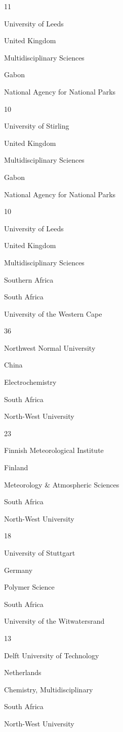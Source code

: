\documentclass[
]{book}
\begin{document}
{11}

{University of Leeds }

{United Kingdom}

{Multidisciplinary Sciences }

{Gabon }

{National Agency for National Parks}

{10}

{University of Stirling }

{United Kingdom}

{Multidisciplinary Sciences }

{Gabon }

{National Agency for National Parks}

{10}

{University of Leeds }

{United Kingdom}

{Multidisciplinary Sciences }

Southern Africa

{South Africa}

{University of the Western Cape }

{36}

{Northwest Normal University }

{China }

{Electrochemistry }

{South Africa}

{North-West University }

{23}

{Finnish Meteorological Institute}

{Finland }

{Meteorology \& Atmospheric Sciences }

{South Africa}

{North-West University }

{18}

{University of Stuttgart }

{Germany }

{Polymer Science }

{South Africa}

{University of the Witwatersrand }

{13}

{Delft University of Technology }

{Netherlands }

{Chemistry, Multidisciplinary }

{South Africa}

{North-West University }
\end{document}
